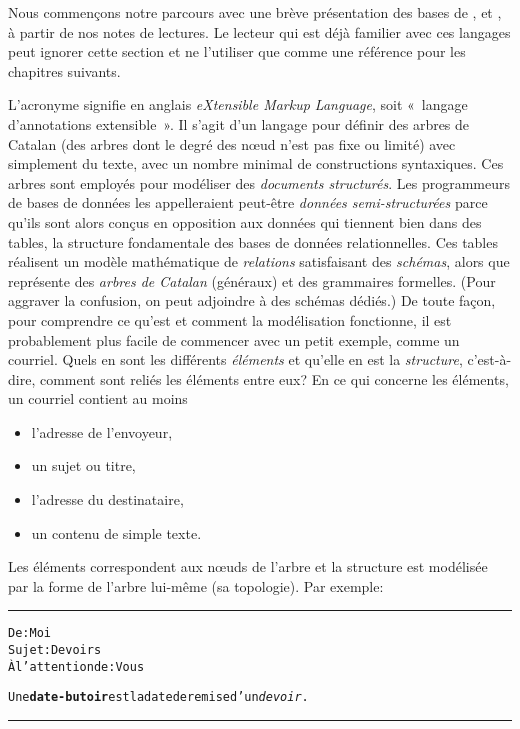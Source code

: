 Nous commençons notre parcours avec une brève présentation des bases
de \XML, \HTML et \DTD, à partir de nos notes de lectures. Le lecteur
qui est déjà familier avec ces langages peut ignorer cette section et
ne l'utiliser que comme une référence pour les chapitres suivants.

\mypar{\XML}

L'acronyme \XML signifie en anglais \emph{eXtensible Markup Language},
soit «~langage d'annotations extensible~». Il s'agit d'un langage pour
définir des arbres de Catalan (des arbres dont le degré des nœud
n'est pas fixe ou limité) avec simplement du texte, avec un nombre
minimal de constructions syntaxiques. Ces arbres sont employés pour
modéliser des \emph{documents structurés}. Les programmeurs de bases
de données les appelleraient peut-être \emph{données semi-structurées}
parce qu'ils sont alors conçus en opposition aux données qui tiennent
bien dans des tables, la structure fondamentale des bases de données
relationnelles. Ces tables réalisent un modèle mathématique de
\emph{relations} satisfaisant des \emph{schémas}, alors que \XML
représente des \emph{arbres de Catalan} (généraux) et des grammaires
formelles. (Pour aggraver la confusion, on peut adjoindre à \XML des
schémas dédiés.)  De toute façon, pour comprendre ce qu'est \XML et
comment la modélisation fonctionne, il est probablement plus facile de
commencer avec un petit exemple, comme un courriel. Quels en sont les
différents \emph{éléments} et qu'elle en est la \emph{structure},
c'est-à-dire, comment sont reliés les éléments entre eux? En ce qui
concerne les éléments, un courriel contient au moins
\begin{itemize}

  \item l'adresse de l'envoyeur,

  \item un sujet ou titre,

  \item l'adresse du destinataire,

  \item un contenu de simple texte.

\end{itemize}
Les éléments correspondent aux nœuds de l'arbre et la structure
est modélisée par la forme de l'arbre lui-même (sa topologie). Par
exemple:\\
\noindent\rule{\linewidth}{0.5pt}
\begin{alltt}
De: Moi
Sujet: Devoirs
À l'attention de: Vous

  Une \textbf{date-butoir} est la date de remise d'un \emph{devoir}.
\end{alltt}
\rule{\linewidth}{0.5pt}

